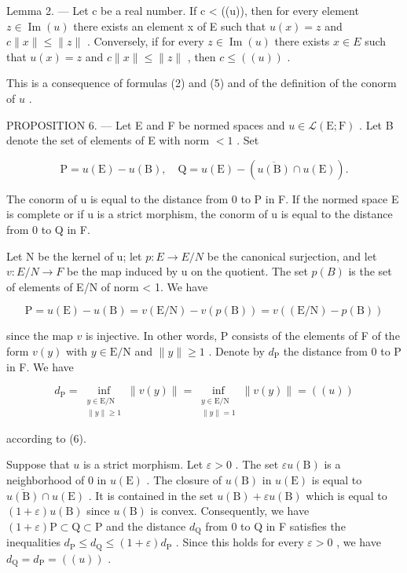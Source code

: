 Lemma 2. --- Let c be a real number. If c \textless{} ((u)), then for every element \(z \in \operatorname{Im}(u)\) there exists an element x of E such that \(u(x) = z\) and \(c \|x\| \leqslant \|z\|\) . Conversely, if for every \(z \in \operatorname{Im}(u)\) there exists \(x \in E\) such that \(u(x) = z\) and \(c \|x\| \leqslant \|z\|\) , then \(c \leqslant ((u))\) .

This is a consequence of formulas (2) and (5) and of the definition of the conorm of \(u\) .

PROPOSITION 6. --- Let E and F be normed spaces and \(u \in \mathcal{L}(\mathrm{E};\mathrm{F})\) . Let B denote the set of elements of E with norm \(< 1\) . Set

\[
\mathrm{P} = u (\mathrm{E}) - u (\mathrm{B}), \quad \mathrm{Q} = u (\mathrm{E}) - (\overline {{u (\mathrm{B})}} \cap u (\mathrm{E})).
\]

The conorm of u is equal to the distance from 0 to P in F. If the normed space E is complete or if u is a strict morphism, the conorm of u is equal to the distance from 0 to Q in F.

Let N be the kernel of u; let \(p: E \to E/N\) be the canonical surjection, and let \(v: E/N \to F\) be the map induced by u on the quotient. The set \(p(B)\) is the set of elements of E/N of norm \textless{} 1. We have

\[
\mathrm{P} = u (\mathrm{E}) - u (\mathrm{B}) = v (\mathrm{E} / \mathrm{N}) - v (p (\mathrm{B})) = v ((\mathrm{E} / \mathrm{N}) - p (\mathrm{B}))
\]

since the map \(v\) is injective. In other words, P consists of the elements of F of the form \(v(y)\) with \(y \in \mathrm{E/N}\) and \(\|y\| \geqslant 1\) . Denote by \(d_{\mathrm{P}}\) the distance from 0 to P in F. We have

\[
d_{\mathrm{P}} = \inf_{\substack{y\in \mathrm{E} / \mathrm{N}\\ \| y\| \geqslant 1}}\| v(y)\| = \inf_{\substack{y\in \mathrm{E} / \mathrm{N}\\ \| y\| = 1}}\| v(y)\| = ((u))
\]

according to (6).

Suppose that \(u\) is a strict morphism. Let \(\varepsilon > 0\) . The set \(\varepsilon u(\mathrm{B})\) is a neighborhood of 0 in \(u(\mathrm{E})\) . The closure of \(u(\mathrm{B})\) in \(u(\mathrm{E})\) is equal to \(\overline{u(\mathrm{B})} \cap u(\mathrm{E})\) . It is contained in the set \(u(\mathrm{B}) + \varepsilon u(\mathrm{B})\) which is equal to \((1 + \varepsilon)u(\mathrm{B})\) since \(u(\mathrm{B})\) is convex. Consequently, we have \((1 + \varepsilon)\mathrm{P} \subset \mathrm{Q} \subset \mathrm{P}\) and the distance \(d_{\mathrm{Q}}\) from 0 to Q in F satisfies the inequalities \(d_{\mathrm{P}} \leqslant d_{\mathrm{Q}} \leqslant (1 + \varepsilon)d_{\mathrm{P}}\) . Since this holds for every \(\varepsilon > 0\) , we have \(d_{\mathrm{Q}} = d_{\mathrm{P}} = ((u))\) .

